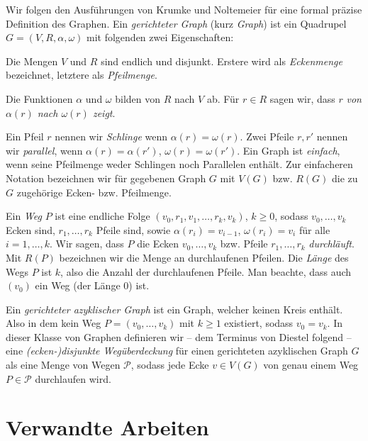 \documentclass[a4paper,10pt,abstract=true,headings=small]{scrartcl}
\begin{document}
Wir folgen den Ausführungen von Krumke und Noltemeier für eine formal präzise Definition des Graphen.
Ein \emph{gerichteter Graph} (kurz \emph{Graph}) ist ein Quadrupel $G=(V,R,\alpha, \omega)$ mit folgenden zwei Eigenschaften:
\begin{enumerate*}
    \item Die Mengen $V$ und $R$ sind endlich und disjunkt.
        Erstere wird als \emph{Eckenmenge} bezeichnet, letztere als \emph{Pfeilmenge}.
    \item Die Funktionen $\alpha$ und $\omega$ bilden von $R$ nach $V$ ab.
        Für $r\in R$ sagen wir, dass $r$ \emph{von $\alpha(r)$ nach $\omega(r)$ zeigt}.
\end{enumerate*}


Ein Pfeil $r$ nennen wir \emph{Schlinge} wenn $\alpha(r)=\omega(r)$. Zwei Pfeile $r, r'$ nennen wir \emph{parallel}, wenn $\alpha(r)=\alpha(r')$, $\omega(r)=\omega(r')$.
Ein Graph ist \emph{einfach}, wenn seine Pfeilmenge weder Schlingen noch Parallelen enthält.\autocite[Vgl.][7--8]{krumke_graphentheoretische_2012}
Zur einfacheren Notation bezeichnen wir für gegebenen Graph $G$ mit $V(G)$ bzw. $R(G)$ die zu $G$ zugehörige Ecken- bzw. Pfeilmenge. %

Ein \emph{Weg} $P$ ist eine endliche Folge $(v_0,\allowbreak r_1,\allowbreak v_1, \dots, r_k, v_k)$, $k\geq 0$, sodass $v_0, \dots, v_k$ Ecken sind, $r_1, \dots, r_k$ Pfeile sind, sowie $\alpha(r_i) = v_{i-1}$, $\omega(r_i)=v_i$ für alle $i=1,\dots, k$.
Wir sagen, dass $P$ die Ecken $v_0, \dots, v_k$ bzw. Pfeile $r_1, \dots, r_k$ \emph{durchläuft}.
Mit $R(P)$ bezeichnen wir die Menge an durchlaufenen Pfeilen.
Die \emph{Länge} des Wegs $P$ ist $k$, also die Anzahl der durchlaufenen Pfeile.
Man beachte, dass auch $(v_0)$ ein Weg (der Länge $0$) ist.\autocite[Vgl.][31]{krumke_graphentheoretische_2012}

Ein \emph{gerichteter azyklischer Graph} ist ein Graph, welcher keinen Kreis enthält.
Also in dem kein Weg $P=(v_0, \dots, v_k)$ mit $k\geq 1$ existiert, sodass $v_0=v_k$.
In dieser Klasse von Graphen definieren wir – dem Terminus von Diestel folgend – eine \emph{(ecken-\nolinebreak{})disjunkte Wegüberdeckung} für einen gerichteten azyklischen Graph $G$ als eine Menge von Wegen $\mathcal{P}$, sodass jede Ecke $v\in V(G)$ von genau einem Weg $P\in\mathcal{P}$ durchlaufen wird.\autocite[55]{diestel_graphentheorie_2006} %


\section{Verwandte Arbeiten}\label{sec:verwandte-arbeiten}
\end{document}
